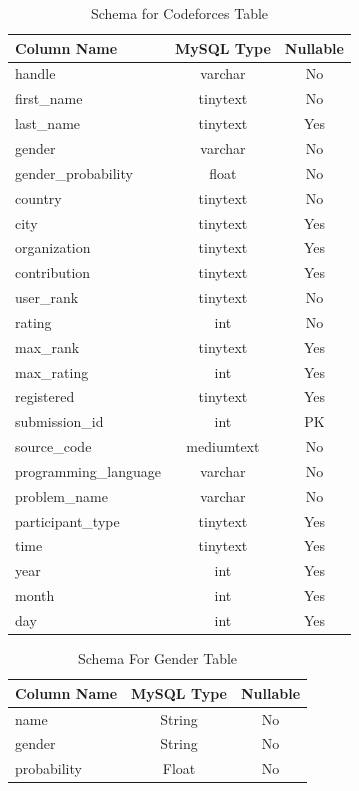 \documentclass[12pt]{article}
\begin{document}
\begin{table}[h!]
    \begin{center}
        \caption{Schema for Codeforces Table}
        \label{tab:cf_schema}
        \begin{tabular}{|l | c | c |}
            \hline
            \textbf{Column Name} & \textbf{MySQL Type} & \textbf{Nullable}\\
            \hline
            handle & varchar & No\\
            first{\_}name & tinytext & No\\
            last{\_}name & tinytext & Yes\\
            gender & varchar & No\\
            gender{\_}probability & float & No\\
            country & tinytext & No\\
            city & tinytext & Yes\\
            organization & tinytext & Yes\\
            contribution & tinytext & Yes\\
            user{\_}rank & tinytext & No\\
            rating & int & No\\
            max{\_}rank & tinytext & Yes\\
            max{\_}rating & int & Yes\\
            registered & tinytext & Yes\\
            \hline
            submission{\_}id & int & PK\\
            source{\_}code & mediumtext & No\\
            programming{\_}language & varchar & No\\
            problem{\_}name & varchar & No\\
            participant{\_}type & tinytext & Yes\\
            time & tinytext & Yes\\
            year & int & Yes\\
            month & int & Yes\\
            day & int & Yes\\
            \hline
        \end{tabular}
    \end{center}
\end{table}

\begin{table}[h!]
    \begin{center}
        \caption{Schema For Gender Table}
        \label{tab:gen_schema}
        \begin{tabular}{| l |c | c |}
            \hline
            \textbf{Column Name} & \textbf{MySQL Type} & \textbf{Nullable}\\
            \hline
            name & String & No\\
            gender & String & No\\
            probability & Float & No\\
            \hline
        \end{tabular}
    \end{center}
\end{table}
\end{document}
